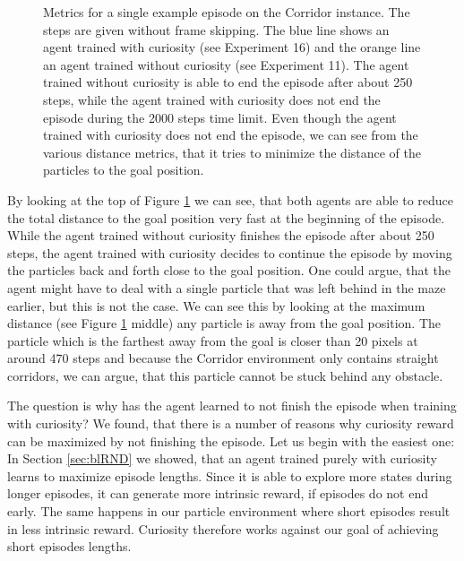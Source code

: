 \begin{figure}[htp]
\begin{center}
\begin{tabular}{c}
        \end{tabular}
    \end{center}
    \caption[Episode metrics on the Corridor Environment]{Metrics for a single example episode on the Corridor instance. The steps are given without frame skipping. The blue line shows an agent trained with curiosity (see Experiment 16) and the orange line an agent trained without curiosity (see Experiment 11). The agent trained without curiosity is able to end the episode after about 250 steps, while the agent trained with curiosity does not end the episode during the 2000 steps time limit. Even though the agent trained with curiosity does not end the episode, we can see from the various distance metrics, that it tries to minimize the distance of the particles to the goal position.} \label{fig:curiosity_ep_analysis}
\end{figure}


By looking at the top of Figure \ref{fig:curiosity_ep_analysis} we can see, that both agents are able to reduce the total distance to the goal position very fast at the beginning of the episode. While the agent trained without curiosity finishes the episode after about 250 steps, the agent trained with curiosity decides to continue the episode by moving the particles back and forth close to the goal position. One could argue, that the agent might have to deal with a single particle that was left behind in the maze earlier, but this is not the case. We can see this by looking at the maximum distance (see Figure \ref{fig:curiosity_ep_analysis} middle) any particle is away from the goal position. The particle which is the farthest away from the goal is closer than 20 pixels at around 470 steps and because the Corridor environment only contains straight corridors, we can argue, that this particle cannot be stuck behind any obstacle. 

The question is why has the agent learned to not finish the episode when training with curiosity? We found, that there is a number of reasons why curiosity reward can be maximized by not finishing the episode. Let us begin with the easiest one: In Section \ref{sec:blRND} we showed, that an agent trained purely with curiosity learns to maximize episode lengths. Since it is able to explore more states during longer episodes, it can generate more intrinsic reward, if episodes do not end early. The same happens in our particle environment where short episodes result in less intrinsic reward. Curiosity therefore works against our goal of achieving short episodes lengths. 

